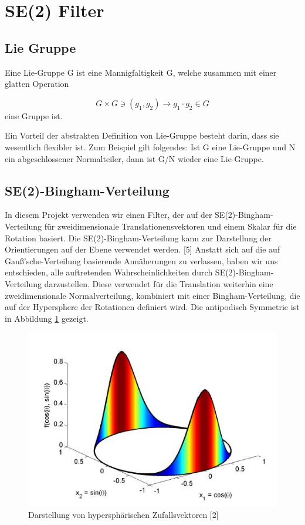 \section{SE(2) Filter}

\subsection{Lie Gruppe}
 Eine Lie-Gruppe G ist eine Mannigfaltigkeit G, welche zusammen mit einer glatten Operation 
 
 \begin{equation*}
  G\times G\ni (g_{1},g_{2})\to g_{1}\cdot g_{2}\in G
 \end{equation*}
eine Gruppe ist.


Ein Vorteil der abstrakten Definition von Lie-Gruppe besteht darin, dass sie wesentlich flexibler ist. Zum Beispiel gilt folgendes: Ist G eine Lie-Gruppe und N ein abgeschlossener Normalteiler, dann ist G/N wieder eine Lie-Gruppe.


\subsection{SE(2)-Bingham-Verteilung}
In diesem Projekt verwenden wir einen Filter, der auf der SE(2)-Bingham-Verteilung für zweidimensionale Translationensvektoren und einem Skalar für die Rotation basiert. Die SE(2)-Bingham-Verteilung kann zur Darstellung der Orientierungen auf der Ebene verwendet werden. [5]
Anstatt sich auf die auf Gauß'sche-Verteilung basierende Annäherungen zu verlassen, haben wir uns entschieden, alle auftretenden Wahrscheinlichkeiten durch SE(2)-Bingham-Verteilung darzustellen. Diese verwendet für die Translation weiterhin eine zweidimensionale Normalverteilung, kombiniert mit einer Bingham-Verteilung, die auf der Hypersphere der Rotationen definiert wird. Die  antipodisch Symmetrie ist in Abbildung \ref{fig:bingham} gezeigt.

\begin{figure}
	\centering
	\includegraphics[width=0.7\linewidth]{Images/bingham}
	\caption{Darstellung von hypersphärischen Zufallsvektoren [2] }
	\label{fig:bingham}
\end{figure}

